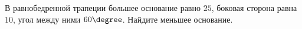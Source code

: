 \begin{ex}
	\begin{condition}
		В равнобедренной трапеции большее основание равно \( 25 \), боковая сторона равна \( 10 \), угол между ними \( 60\degree  \). Найдите меньшее основание.
	\end{condition}
\end{ex}